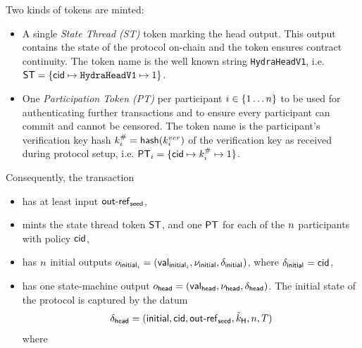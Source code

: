 \noindent Two kinds of tokens are minted:
\begin{itemize}
	\item A single \emph{State Thread (ST)} token marking the head output. This
	      output contains the state of the protocol on-chain and the token ensures
	      contract continuity. The token name is the well known string
	      \texttt{HydraHeadV1}, i.e.
	      $\mathsf{ST} = \{\mathsf{cid} \mapsto \texttt{HydraHeadV1} \mapsto 1\}$.
	\item One \emph{Participation Token (PT)} per participant
	      $i \in \{1 \dots n \}$ to be used for authenticating further
	      transactions and to ensure every participant can commit and cannot be
	      censored. The token name is the participant's verification key hash
	      $k^{\#}_{i} = \mathsf{hash}(k^{ver}_{i})$ of the verification key as received
	      during protocol setup, i.e.
	      $\mathsf{PT}_{i} = \{\mathsf{cid} \mapsto k^{\#}_{i} \mapsto 1\}$.
\end{itemize}

\noindent Consequently, the \mtxInit{} transaction

\begin{samepage}
	\begin{itemize}
		\item has at least input $\mathsf{out\textsf{-}{}ref}_{\mathsf{seed}}$,
		\item mints the state thread token $\mathsf{ST}$, and one $\mathsf{PT}$ for each of the $n$
		      participants with policy $\mathsf{cid}$,
		\item has $n$ initial outputs
		      $o_{\mathsf{initial}_{i}} = (\mathsf{val}_{\mathsf{initial}_{i}}, \nu_{\mathsf{initial}}, \delta_{\mathsf{initial}_{}})$,
		      where $\delta_{\mathsf{initial}_{}} = \mathsf{cid}$,
		\item has one state-machine output
		      $o_{\mathsf{head}} = (\mathsf{val}_{\mathsf{head}}, \nu_\mathsf{head}, \delta_{\mathsf{head}})$. The initial state
		      of the protocol is captured by the datum
		      \[
			      \delta_{\mathsf{head}} = (\mathsf{initial},\mathsf{cid},\mathsf{out\textsf{-}{}ref}_{\mathsf{seed}},\tilde{k}_{\mathsf{H}},n,T)
		      \]
		      where
	\end{itemize}
\end{samepage}

